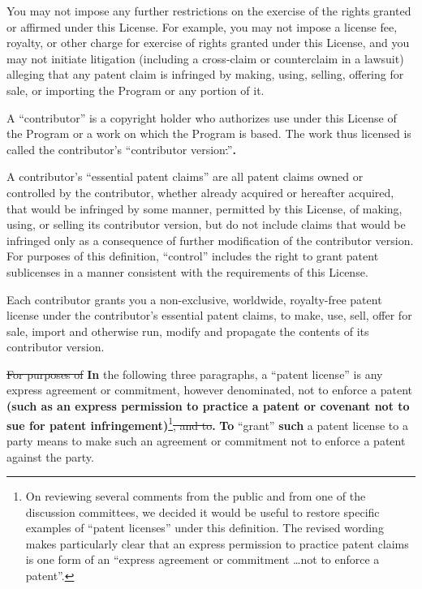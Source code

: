 \documentclass[11pt]{article}
\newcounter{v2section}
\newcounter{v3section}
\begin{document}
  You may not impose any further restrictions on the exercise of the
rights granted or affirmed under this License.  For example, you may
not impose a license fee, royalty, or other charge for exercise of
rights granted under this License, and you may not initiate litigation
(including a cross-claim or counterclaim in a lawsuit) alleging that
any patent claim is infringed by making, using, selling, offering for
sale, or importing the Program or any portion of it.


  A ``contributor'' is a copyright holder who authorizes use under this
License of the Program or a work on which the Program is based.  The
work thus licensed is called the contributor's ``contributor
version\sout{.}''\textbf{.}

  A contributor's ``essential patent claims'' are all patent claims
owned or controlled by the contributor, whether already acquired or
hereafter acquired, that would be infringed by some manner, permitted by
this License, of making, using, or selling its contributor version, but
do not include claims that would be infringed only as a consequence of
further modification of the contributor version.  For purposes of this
definition, ``control'' includes the right to grant patent sublicenses
in a manner consistent with the requirements of this License.

  Each contributor grants you a non-exclusive, worldwide, royalty-free
patent license under the contributor's essential patent claims, to make,
use, sell, offer for sale, import and otherwise run, modify and
propagate the contents of its contributor version.

  \sout{For purposes of} \textbf{In} the following three paragraphs, a
``patent license'' is any express agreement or commitment, however
denominated, not to enforce a patent \textbf{(such as an express
permission to practice a patent or covenant not to sue for patent
infringement)}\footnote{On reviewing several comments from the public
and from one of the discussion committees, we decided it would be useful
to restore specific examples of ``patent licenses'' under this
definition.  The revised wording makes particularly clear that an
express permission to practice patent claims is one form of an ``express
agreement or commitment \dots not to enforce a patent''.}\sout{, and
to}\textbf{.} \textbf{To} ``grant'' \textbf{such} a patent license to a
party means to make such an agreement or commitment not to enforce a
patent against the party.
\end{document}
